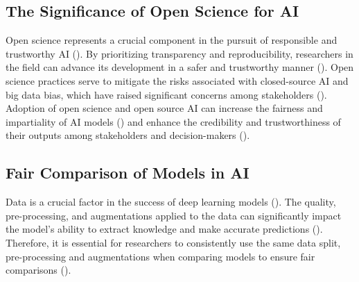 \subsection{The Significance of Open Science for AI}

 
Open science represents a crucial component in the pursuit of responsible and trustworthy AI (\cite{floridi2019establishing,coro2020open,braun2018open,hicks2021open}). By prioritizing transparency and reproducibility, researchers in the field can advance its development in a safer and trustworthy manner (\cite{coro2020open,floridi2018ai4people,kocak2022transparency,stodden-towardreprodicibleresearch}).
Open science practices serve to mitigate the risks associated with closed-source AI and big data bias, which have raised significant concerns among stakeholders (\cite{batarseh2020data, o2017weapons}). Adoption of open science and open source AI can increase the fairness and impartiality of AI models (\cite{stodden-towardreprodicibleresearch,accountabilityInAi,gundersen2018reproducible}) and enhance the credibility and trustworthiness of their outputs among stakeholders and decision-makers (\cite{goodman2017european,hsiao2018vtaiwan,praprotnikevaluation}). %

\subsection{Fair Comparison of Models in AI}

Data is a crucial factor in the success of deep learning models (\cite{lecun2015deep}). The quality, pre-processing, and augmentations applied to the data can significantly impact the model's ability to extract knowledge and make accurate predictions (\cite{shorten2019survey}). Therefore, it is essential for researchers to consistently use the same data split, pre-processing and augmentations when comparing models to ensure fair comparisons (\cite{caton2020fairness,mehrabi2021survey, leakage-recrisis}).


